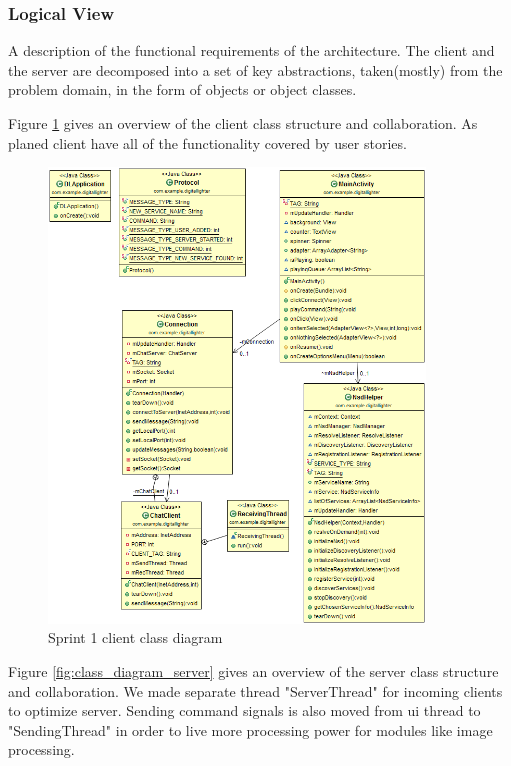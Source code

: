 \subsubsection{Logical View}
A description of the functional requirements of the architecture. The client and the server are decomposed into a set of key abstractions, taken(mostly) from the problem domain, in the form of objects or object classes.

Figure \ref{fig:class_diagram_client} gives an overview of the client class structure and collaboration. As planed client have all of the functionality covered by user stories. 

\begin{figure}[!H]
	\centering
		\includegraphics[width=10cm]{sprint1/class_diagram_client.png}
	\caption{Sprint 1 client class diagram}
	\label{fig:class_diagram_client}
\end{figure}

Figure \ref{fig:class_diagram_server} gives an overview of the server class structure and collaboration. We made separate thread "ServerThread" for incoming clients to optimize server. Sending command signals is also moved from ui thread to "SendingThread" in order to live more processing power for modules like image processing.

